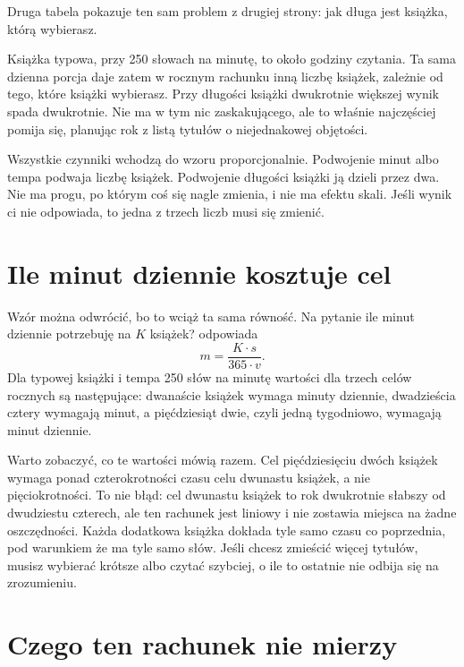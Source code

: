 Druga tabela pokazuje ten sam problem z drugiej strony: jak długa jest książka, którą wybierasz.


Książka typowa, przy 250 słowach na minutę, to około  godziny czytania. Ta sama dzienna porcja daje zatem w rocznym rachunku inną liczbę książek, zależnie od tego, które książki wybierasz. Przy długości książki dwukrotnie większej wynik spada dwukrotnie. Nie ma w tym nic zaskakującego, ale to właśnie najczęściej pomija się, planując rok z listą tytułów o niejednakowej objętości.

\begin{zasada}
Wszystkie czynniki wchodzą do wzoru proporcjonalnie. Podwojenie minut albo tempa podwaja liczbę książek. Podwojenie długości książki ją dzieli przez dwa. Nie ma progu, po którym coś się nagle zmienia, i nie ma efektu skali. Jeśli wynik ci nie odpowiada, to jedna z trzech liczb musi się zmienić.
\end{zasada}

\section{Ile minut dziennie kosztuje cel}

Wzór można odwrócić, bo to wciąż ta sama równość. Na pytanie \glqq ile minut dziennie potrzebuję na $K$ książek?\grqq{} odpowiada
\[ m = \frac{K \cdot s}{365 \cdot v}. \]
Dla typowej książki i tempa 250 słów na minutę wartości dla trzech celów rocznych są następujące: dwanaście książek wymaga  minuty dziennie, dwadzieścia cztery wymagają  minut, a pięćdziesiąt dwie, czyli jedną tygodniowo, wymagają  minut dziennie.

Warto zobaczyć, co te wartości mówią razem. Cel pięćdziesięciu dwóch książek wymaga ponad czterokrotności czasu celu dwunastu książek, a nie pięciokrotności. To nie błąd: cel dwunastu książek to rok dwukrotnie słabszy od dwudziestu czterech, ale ten rachunek jest liniowy i nie zostawia miejsca na żadne oszczędności. Każda dodatkowa książka dokłada tyle samo czasu co poprzednia, pod warunkiem że ma tyle samo słów. Jeśli chcesz zmieścić więcej tytułów, musisz wybierać krótsze albo czytać szybciej, o ile to ostatnie nie odbija się na zrozumieniu.

\section{Czego ten rachunek nie mierzy}

